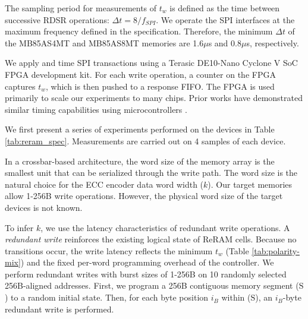 The sampling period for measurements of $t_w$ is defined as the time between successive RDSR operations: $\Delta t = {8}/{f_{SPI}}.$
We operate the SPI interfaces at the maximum frequency defined in the specification. Therefore, the minimum $\Delta t$ of the MB85AS4MT and MB85AS8MT memories are 1.6$\mu$s and 0.8$\mu$s, respectively.

We apply and time SPI transactions using a Terasic DE10-Nano Cyclone V SoC FPGA development kit. For each write operation, a counter on the FPGA captures $t_w$, which is then pushed to a response FIFO. The FPGA is used primarily to scale our experiments to many chips. Prior works have demonstrated similar timing capabilities using microcontrollers \cite{tolga2024trng, ferdaus2024hiding}.



\label{sec:investigation-expts}
We first present a series of experiments performed on the devices in  Table \ref{tab:reram_spec}.
Measurements are carried out on 4 samples of each device.

\label{sec:red}
\label{exp:i}

% 


In a crossbar-based architecture, the word size of the memory array is the smallest unit that can be serialized through the write path. The word size is the natural choice for the ECC encoder data word width ($k$). Our target memories allow 1-256B write operations. However, the physical word size of the target devices is not known.

To infer $k$, we use the latency characteristics of redundant write operations. A \textit{redundant write} reinforces the existing logical state of ReRAM cells. Because no transitions occur, the write latency reflects the minimum $t_{w}$ (Table \ref{tab:polarity-mix}) and the fixed per-word programming overhead of the controller. 
We perform redundant writes with burst sizes of 1-256B on 10 randomly selected 256B-aligned addresses. First, we program a 256B contiguous memory segment ($\mathrm{S}$) to a random initial state. Then, for each byte position $i_B$ within ($\mathrm{S}$), an $i_B$-byte redundant write is performed.


